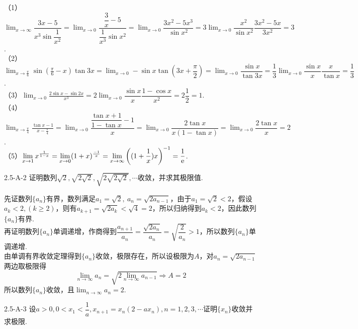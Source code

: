 \begin{solution}
    （1）$\displaystyle\lim_{x\to\infty}\dfrac{3x-5}{x^3\sin\dfrac{1}{x^2}}=\lim_{x\to 0}\dfrac{\dfrac{3}{x}-5}{\dfrac{1}{x^3}\sin x^2}=\lim_{x\to 0}\dfrac{3x^2-5x^3}{\sin x^2}=3\lim_{x\to 0}\dfrac{x^2}{\sin x^2}\dfrac{3x^2-5x}{3x^2}=3$.\\\vspace{0.5em}
    （2）$\displaystyle\lim _{x \rightarrow \frac{\pi}{6}} \sin \left(\frac{\pi}{6}-x\right) \tan 3 x=\lim _{x \rightarrow 0}-\sin x\tan(3x+\dfrac{\pi}{2})=\lim_{x\to 0}\dfrac{\sin x}{\tan 3x}=\dfrac13\lim_{x\to 0}\dfrac{\sin x}{x}\dfrac{x}{\tan x}=\dfrac13$.\\\vspace{0.5em}
    （3）$\displaystyle\lim _{x \rightarrow 0} \frac{2 \sin x-\sin 2 x}{x^{3}}=2\lim _{x \rightarrow 0}\dfrac{\sin x}{x}\dfrac{1-\cos x}{x^2}=2\dfrac12=1$.\\\vspace{0.5em}
    （4）$\displaystyle\lim _{x \rightarrow \frac{\pi}{4}} \frac{\tan x-1}{x-\frac{\pi}{4}}=\lim _{x \rightarrow 0}\dfrac{\dfrac{\tan x+1}{1-\tan x}-1}{x}=\lim _{x \rightarrow 0}\dfrac{2\tan x}{x(1-\tan x)}=\lim_{x\to 0}\dfrac{2\tan x}{x}=2$.\\\vspace{0.5em}
    （5）$\displaystyle\lim _{x \rightarrow 1} x^{\frac{1}{1-x}}=\lim _{x \rightarrow 0}(1+x)^{\frac{-1}{x}}=\lim_{x \rightarrow \infty}\bigg((1+\dfrac1x){x}\bigg)^{-1}=\dfrac{1}{\text{e}}$.
\end{solution}
\begin{example}{2.5-A-2}{}
    证明数列$\sqrt2,\sqrt{2\sqrt2},\sqrt{2\sqrt{2\sqrt2}},\cdots$收敛，并求其极限值.
\end{example}
\begin{solution}
    先证数列$\{a_n\}$有界，数列满足$a_1=\sqrt2,\ a_n=\sqrt{2a_{n-1}}$，由于$a_1=\sqrt2<2$，假设$a_k<2,(k\geq 2)$，则有$a_{k+1}=\sqrt{2a_k}<\sqrt4=2$，所以归纳得到$a_k<2$，因此数列$\{a_n\}$有界.\\
    再证明数列$\{a_n\}$单调递增，作商得到$\dfrac{a_{n+1}}{a_n}=\dfrac{\sqrt{2a_n}}{a_n}=\sqrt{\dfrac{2}{a_n}}>1$，所以数列$\{a_n\}$单调递增.\\
    由单调有界收敛定理得到$\{a_n\}$收敛，极限存在，所以设极限为$A$，对$a_n=\sqrt{2a_{n-1}}$两边取极限得
    \[\displaystyle\lim_{n\to\infty}a_n=\sqrt{2\lim_{n\to\infty}a_{n-1}}\Rightarrow A=2\]所以数列$\{a_n\}$收敛，且$\lim_{n\to\infty}a_n=2$.
\end{solution}
\begin{example}{2.5-A-3}{}
    设$a>0,0<x_1<\dfrac1{a},x_{n+1}=x_n(2-ax_n),n=1,2,3,\cdots$证明$\{x_n\}$收敛并求极限.
\end{example}

